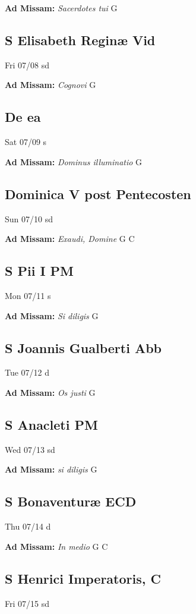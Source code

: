\documentclass[letterpaper, 10pt, twocolumn]{article}
\begin{document}
\textbf{Ad Missam:} \textit{Sacerdotes tui} G 

\subsection*{S Elisabeth Reginæ Vid}Fri 07/08 sd

\textbf{Ad Missam:} \textit{Cognovi} G 

\subsection*{De ea}Sat 07/09 s

\textbf{Ad Missam:} \textit{Dominus illuminatio} G 

\subsection*{Dominica V post Pentecosten}Sun 07/10 sd

\textbf{Ad Missam:} \textit{Exaudi, Domine} G C 

\subsection*{S Pii I PM}Mon 07/11 s

\textbf{Ad Missam:} \textit{Si diligis} G 

\subsection*{S Joannis Gualberti Abb}Tue 07/12 d

\textbf{Ad Missam:} \textit{Os justi} G 

\subsection*{S Anacleti PM}Wed 07/13 sd

\textbf{Ad Missam:} \textit{si diligis} G 

\subsection*{S Bonaventuræ ECD}Thu 07/14 d

\textbf{Ad Missam:} \textit{In medio} G C 

\subsection*{S Henrici Imperatoris, C}Fri 07/15 sd
\end{document}
